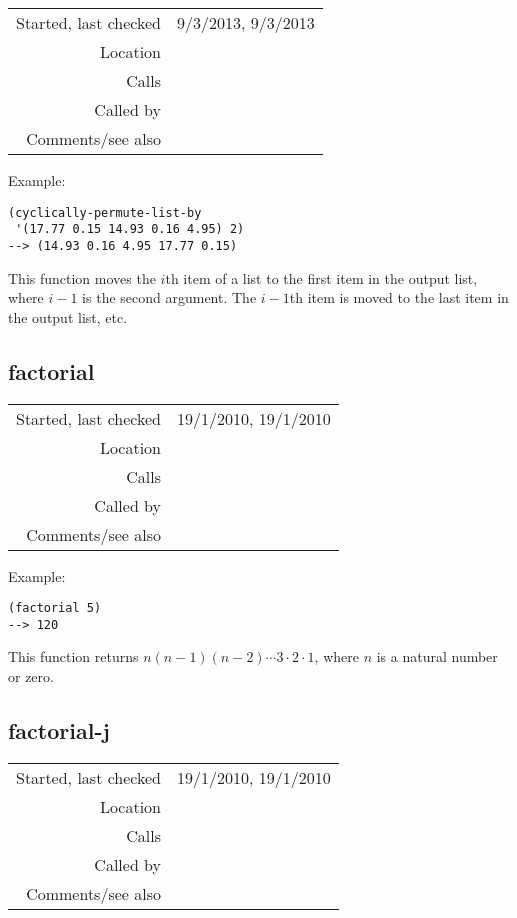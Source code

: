 \vspace{0.3cm}
\begin{tabular}{r|p{8cm}}
Started, last checked & 9/3/2013, 9/3/2013 \\
Location & \nameref{sec:list-processing} \\
Calls & \\
Called by & \\
Comments/see also & 
\end{tabular}

\vspace{0.5cm}
\noindent Example:
\begin{verbatim}
(cyclically-permute-list-by
 '(17.77 0.15 14.93 0.16 4.95) 2)
--> (14.93 0.16 4.95 17.77 0.15)
\end{verbatim}

\noindent This function moves the $i$th item of a list
to the first item in the output list, where $i - 1$ is
the second argument. The $i-1$th item is moved to the
last item in the output list, etc.


\subsection*{factorial}\label{fun:factorial}

\vspace{0.3cm}
\begin{tabular}{r|p{8cm}}
Started, last checked & 19/1/2010, 19/1/2010 \\
Location & \nameref{sec:list-processing} \\
Calls & \\
Called by & \nameref{fun:choose} \\
Comments/see also & 
\end{tabular}

\vspace{0.5cm}
\noindent Example:
\begin{verbatim}
(factorial 5)
--> 120
\end{verbatim}

\noindent This function returns
$n(n-1)(n-2)\cdots 3\cdot 2\cdot 1$,
where $n$ is a natural number or zero.


\subsection*{factorial-j}\label{fun:factorial-j}

\vspace{0.3cm}
\begin{tabular}{r|p{8cm}}
Started, last checked & 19/1/2010, 19/1/2010 \\
Location & \nameref{sec:list-processing} \\
Calls & \\
Called by & \nameref{fun:choose} \\
Comments/see also & 
\end{tabular}

